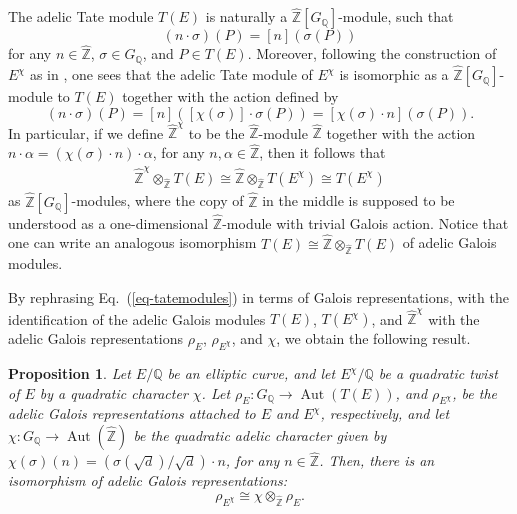 \documentclass[11pt]{amsart}
\newtheorem{prop}[defn]{Proposition}
\theoremstyle{definition}
\newcommand{\Q}{\mathbb{Q}}
\newcommand{\Z}{\mathbb{Z}}
\newcommand{\Aut}{\operatorname{Aut}}
\begin{document}
The adelic Tate module $T(E)$ is naturally a $\widehat{\Z}[G_\Q]$-module, such that 
$$(n\cdot \sigma)(P) = [n](\sigma(P))$$
for any $n\in \widehat{\Z}$, $\sigma\in G_\Q$, and $P\in T(E)$. Moreover, following the construction of $E^\chi$ as in \cite[Ch. X, Example 2.4]{silverman1}, one sees that the adelic Tate module of $E^\chi$ is isomorphic as a $\widehat{\Z}[G_\Q]$-module to $T(E)$ together with the action defined by
$$(n\cdot \sigma)(P) = [n]([\chi(\sigma)]\cdot\sigma(P)) = [\chi(\sigma)\cdot n](\sigma(P)).$$
In particular, if we define $\widehat{\Z}^\chi$ to be the $\widehat{\Z}$-module $\widehat{\Z}$ together with the action $n\cdot \alpha = (\chi(\sigma)\cdot n) \cdot \alpha$, for any $n,\alpha\in\widehat{\Z}$, then it follows that
\begin{align} \label{eq-tatemodules}
    \widehat{\Z}^\chi \otimes_{\widehat{\Z}}  T(E) \cong \widehat{\Z}\otimes_{\widehat{\Z}}  T(E^\chi) \cong T(E^\chi)
    \end{align}
as $\widehat{\Z}[G_\Q]$-modules, where the copy of $\widehat{\Z}$ in the middle is supposed to be understood as a one-dimensional $\widehat{\Z}$-module with trivial Galois action. Notice that one can write an analogous isomorphism $T(E)\cong \widehat{\Z}\otimes_{\widehat{\Z}} T(E)$ of adelic Galois modules.

By rephrasing Eq.~(\ref{eq-tatemodules}) in terms of Galois representations, with the identification of the adelic Galois modules $T(E)$, $T(E^\chi)$, and $\widehat{\Z}^\chi$ with the adelic Galois representations $\rho_E$, $\rho_{E^\chi}$, and $\chi$, we obtain the following result. 

\begin{prop}
\label{cpx_conj_lemma}\label{cpx_conj_prop}
Let $E/\Q$ be an elliptic curve, and let $E^{\chi}/\Q$ be a quadratic twist of $E$ by a quadratic character $\chi$. Let $\rho_{E} \colon G_{\Q} \to \Aut(T(E))$, and $\rho_{E^\chi}$, be the adelic Galois representations attached to $E$ and $E^\chi$, respectively, and let $\chi\colon G_\Q \to \Aut(\widehat{\Z})$ be the quadratic adelic character given by $\chi(\sigma)(n) = (\sigma(\sqrt{d})/\sqrt{d})\cdot n$, for any $n\in \widehat{\Z}$. Then, there is an isomorphism of adelic Galois representations:
\[ \rho_{E^{\chi}} \cong \chi \otimes_{\widehat{\Z}} \rho_{E}. \]
\end{prop}
\end{document}
